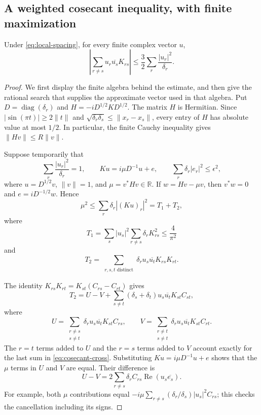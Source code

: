 \subsection{A weighted cosecant inequality, with finite maximization}

\begin{lemma}
\label{lem:weighted-cosecant}
Under \eqref{eq:local-spacing}, for every finite complex vector $u$,
\begin{equation}
 \left|\sum_{r\ne s}u_r\overline{u_s}K_{rs}\right|
 \leq\frac32\sum_r\frac{|u_r|^2}{\delta_r}.
 \label{eq:weighted-cosecant}
\end{equation}
\end{lemma}

\begin{proof}
We first display the finite algebra behind the estimate, and then
give the rational search that supplies the approximate vector used
in that algebra.  Put $D=\operatorname{diag}(\delta_r)$ and
$H=-iD^{1/2}KD^{1/2}$.  The matrix $H$ is Hermitian.
Since $|\sin(\pi t)|\geq2\|t\|$ and
$\sqrt{\delta_r\delta_s}\leq\|x_r-x_s\|$, every entry of $H$ has
absolute value at most $1/2$.  In particular, the finite Cauchy
inequality gives $\|Hv\|\leq R\|v\|$.

Suppose temporarily that
\[
 \sum_r\frac{|u_r|^2}{\delta_r}=1,
 \qquad Ku=i\mu D^{-1}u+e,
 \qquad \sum_r\delta_r|e_r|^2\leq\epsilon^2,
\]
where $u=D^{1/2}v$, $\|v\|=1$, and
$\mu=v^*Hv\in\mathbb R$.  If $w=Hv-\mu v$, then $v^*w=0$ and
$e=iD^{-1/2}w$.  Hence
\begin{equation}
 \mu^2\leq\sum_r\delta_r|(Ku)_r|^2=T_1+T_2,
 \label{eq:cosecant-expansion}
\end{equation}
where
\[
 T_1=\sum_s|u_s|^2\sum_{r\ne s}\delta_r K_{rs}^2
 \leq\frac4{\pi^2}
\]
and
\[
 T_2=\sum_{\substack{r,s,t\text{ distinct}}}
       \delta_r u_s\overline{u_t}K_{rs}K_{rt}.
\]

The identity $K_{rs}K_{rt}=K_{st}(C_{rs}-C_{rt})$ gives
\begin{equation}
 T_2=U-V+\sum_{s\ne t}(\delta_s+\delta_t)
             u_s\overline{u_t}K_{st}C_{st},
 \label{eq:cosecant-cross}
\end{equation}
where
\[
 U=\sum_{\substack{r\ne s\\s\ne t}}
       \delta_r u_s\overline{u_t}K_{st}C_{rs},
 \qquad
 V=\sum_{\substack{r\ne t\\s\ne t}}
       \delta_r u_s\overline{u_t}K_{st}C_{rt}.
\]
The $r=t$ terms added to $U$ and the $r=s$ terms added to $V$
account exactly for the last sum in \eqref{eq:cosecant-cross}.
Substituting $Ku=i\mu D^{-1}u+e$ shows that the $\mu$ terms in
$U$ and $V$ are equal.  Their difference is
\begin{equation}
 U-V=2\sum_{r\ne s}\delta_r C_{rs}
                     \operatorname{Re}(u_s\overline{e_s}).
 \label{eq:cross-residual}
\end{equation}
For example, both $\mu$ contributions equal
$-i\mu\sum_{r\ne s}(\delta_r/\delta_s)|u_s|^2C_{rs}$;
this checks the cancellation including its signs.


\end{proof}
